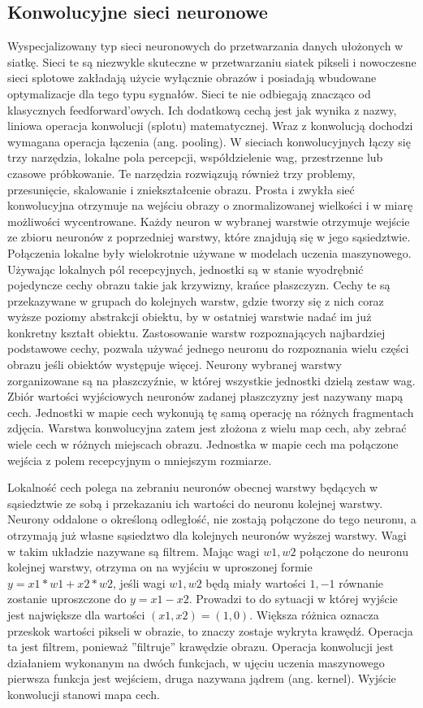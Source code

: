 \documentclass[12pt,a4paper,twoside,titlepage,openright]{book}
\begin{document}
\subsection{Konwolucyjne sieci neuronowe}
Wyspecjalizowany typ sieci neuronowych do przetwarzania danych ułożonych w siatkę. Sieci te są niezwykle skuteczne w przetwarzaniu siatek pikseli i nowoczesne sieci splotowe zakładają użycie wyłącznie obrazów i posiadają wbudowane optymalizacje dla tego typu sygnałów. Sieci te nie odbiegają znacząco od klasycznych feedforward'owych. Ich dodatkową cechą jest jak wynika z nazwy, liniowa operacja konwolucji (splotu) matematycznej. Wraz z konwolucją dochodzi wymagana operacja łączenia (ang. pooling).  W sieciach konwolucyjnych łączy się trzy narzędzia, lokalne pola percepcji, współdzielenie wag, przestrzenne lub czasowe próbkowanie. Te narzędzia rozwiązują również trzy problemy, przesunięcie, skalowanie i zniekształcenie obrazu.
Prosta i zwykła sieć konwolucyjna otrzymuje na wejściu obrazy o znormalizowanej wielkości i w miarę możliwości wycentrowane. Każdy neuron w wybranej warstwie otrzymuje wejście ze zbioru neuronów z poprzedniej warstwy, które znajdują się w jego sąsiedztwie. Połączenia lokalne były wielokrotnie używane w modelach uczenia maszynowego. Używając lokalnych pól recepcyjnych, jednostki są w stanie wyodrębnić pojedyncze cechy obrazu takie jak krzywizny, krańce płaszczyzn. Cechy te są przekazywane w grupach do kolejnych warstw, gdzie tworzy się z nich coraz wyższe poziomy abstrakcji obiektu, by w ostatniej warstwie nadać im już konkretny kształt obiektu. Zastosowanie warstw rozpoznających najbardziej podstawowe cechy, pozwala używać jednego neuronu do rozpoznania wielu części obrazu jeśli obiektów występuje więcej. Neurony wybranej warstwy zorganizowane są na płaszczyźnie, w której wszystkie jednostki dzielą zestaw wag. Zbiór wartości wyjściowych neuronów zadanej płaszczyzny jest nazywany mapą cech. Jednostki w mapie cech wykonują tę samą operację na różnych fragmentach zdjęcia. Warstwa konwolucyjna zatem jest złożona z wielu map cech, aby zebrać wiele cech w różnych miejscach obrazu. Jednostka w mapie cech ma połączone wejścia z polem recepcyjnym o mniejszym rozmiarze.

Lokalność cech polega na zebraniu neuronów obecnej warstwy będących w sąsiedztwie ze sobą i przekazaniu ich wartości do neuronu kolejnej warstwy. Neurony oddalone o określoną odległość, nie zostają połączone do tego neuronu, a otrzymają już własne sąsiedztwo dla kolejnych neuronów wyższej warstwy. Wagi w takim układzie nazywane są filtrem. Mając wagi \(w1, w2\) połączone do neuronu kolejnej warstwy, otrzyma on na wyjściu w uproszonej formie \(y = x1*w1 + x2*w2 \), jeśli wagi \(w1, w2\) będą miały wartości \(1, -1\) równanie zostanie uproszczone do  \(y = x1 - x2 \). Prowadzi to do sytuacji w której wyjście jest największe dla wartości \( (x1,x2) = (1,0)\). Większa różnica oznacza przeskok wartości pikseli w obrazie, to znaczy zostaje wykryta krawędź. Operacja ta jest filtrem, ponieważ ''filtruje'' krawędzie obrazu.
Operacja konwolucji jest działaniem wykonanym na dwóch funkcjach, w ujęciu uczenia maszynowego pierwsza funkcja jest wejściem, druga nazywana jądrem (ang. kernel). Wyjście konwolucji stanowi mapa cech.
\end{document}

